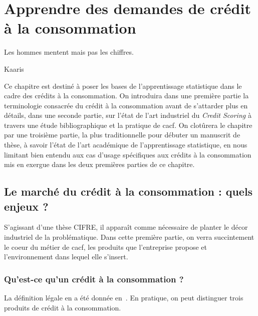 \chapter{Apprendre des demandes de crédit à la consommation} \label{chap1}


\epigraph{Les hommes mentent mais pas les chiffres.}{Kaaris}

\adjustmtc
\adjustmtc
\minitoc

Ce chapitre est destiné à poser les bases de l'apprentissage statistique dans le cadre des crédits à la consommation. On introduira dans une première partie la terminologie consacrée du crédit à la consommation avant de s'attarder plus en détails, dans une seconde partie, sur l'état de l'art industriel du \textit{Credit Scoring} à travers une étude bibliographique et la pratique de \gls{cacf}. On clotûrera le chapitre par une troisième partie, la plus traditionnelle pour débuter un manuscrit de thèse, à savoir l'état de l'art académique de l'apprentissage statistique, en nous limitant bien entendu aux cas d'usage spécifiques aux crédits à la consommation mis en exergue dans les deux premières parties de ce chapitre.

\section{Le marché du crédit à la consommation : quels enjeux ?} \label{chap1:sec1}

S'agissant d'une thèse CIFRE, il apparaît comme nécessaire de planter le décor industriel de la problématique. Dans cette première partie, on verra succintement le coeur du métier de \gls{cacf}, les produits que l'entreprise propose et l'environnement dans lequel elle s'insert.

\subsection{Qu'est-ce qu'un crédit à la consommation ?}

La définition légale en a été donnée en~. En pratique, on peut distinguer trois produits de crédit à la consommation.


